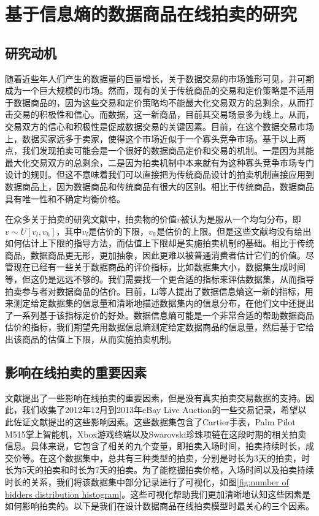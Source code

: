 \chapter{基于信息熵的数据商品在线拍卖的研究}

\section{研究动机}
随着近些年人们产生的数据量的巨量增长，关于数据交易的市场雏形可见，并可期成为一个巨大规模的市场。然而，现有的关于传统商品的交易和定价策略是不适用于数据商品的，因为这些交易和定价策略均不能最大化交易双方的总剩余，从而打击交易的积极性和信心。而数据，这一新商品，目前其交易场景多为线上。从而，交易双方的信心和积极性是促成数据交易的关键因素。目前，在这个数据交易市场上，数据买家远多于卖家，使得这个市场近似于一个寡头竞争市场。基于以上两点，我们发现拍卖可能会是一个很好的数据商品定价和交易的机制。一是因为其能最大化交易双方的总剩余，二是因为拍卖机制中本来就有为这种寡头竞争市场专门设计的规则。但这不意味着我们可以直接把为传统商品设计的拍卖机制直接应用到数据商品上，因为数据商品和传统商品有很大的区别。相比于传统商品，数据商品具有唯一性和不确定均衡价格。

在众多关于拍卖的研究文献中\cite{Vickrey1961Counterspeculation,Milgrom1989Auctions,Milgrom1982A,Riley1981Optimal}，拍卖物的价值$v$被认为是服从一个均匀分布，即$v\sim U[v_l,v_h]$，其中$v_l$是估价的下限，$v_h$是估价的上限。但是这些文献均没有给出如何估计上下限的指导方法，而估值上下限却是实施拍卖机制的基础。相比于传统商品，数据商品更无形，更加抽象，因此更难以被普通消费者估计它们的价值。尽管现在已经有一些关于数据商品的评价指标，比如数据集大小，数据集生成时间等，但这仍是远远不够的。我们需要找一个更合适的指标来评估数据集，从而指导拍卖参与者对数据商品的估价。目前，Li等人\cite{li2017first}提出了数据信息熵这一新的指标，用来测定给定数据集的信息量和清晰地描述数据集内的信息分布，在他们文中还提出了一系列基于该指标定价的好处。数据信息熵可能是一个非常合适的帮助数据商品估价的指标，我们期望先用数据信息熵测定给定数据商品的信息量，然后基于它给出该商品的估值上下限，从而实施拍卖机制。

\section{影响在线拍卖的重要因素}
文献\cite{Pinker2003Managing}提出了一些影响在线拍卖的重要因素，但是没有真实拍卖交易数据的支持。因此，我们收集了2012年12月到2013年eBay Live Auction的一些交易记录，希望以此佐证文献\cite{Pinker2003Managing}提出的这些影响因素。这些数据集包含了Cartier手表，Palm Pilot M515掌上智能机，Xbox游戏终端以及Swarovski珍珠项链在这段时期的相关拍卖信息。具体来说，它包含了相关的九个变量，即拍卖入场时间，拍卖持续时长，成交价等。在这个数据集中，总共有三种类型的拍卖，分别是时长为3天的拍卖，时长为5天的拍卖和时长为7天的拍卖。为了能挖掘拍卖价格，入场时间以及拍卖持续时长的关系，我们将该数据集中部分记录进行了可视化，如图\ref{fig:number of bidders distribution histogram}。这些可视化帮助我们更加清晰地认知这些因素是如何影响拍卖的。以下是我们在设计数据商品在线拍卖模型时最关心的三个因素。

